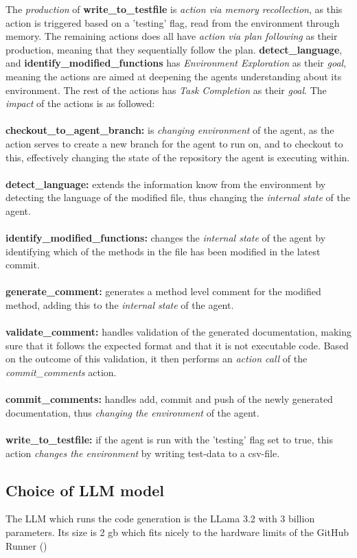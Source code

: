\noindent
The \textit{production} of \textbf{write\_to\_testfile} is \textit{action via memory recollection}, as 
this action is triggered based on a 'testing' flag, read from the environment through memory. The remaining actions does all have \textit{action via plan following} as their production, meaning that they sequentially follow the plan. \textbf{detect\_language}, and \textbf{identify\_modified\_functions} has \textit{Environment Exploration} as their \textit{goal}, meaning the actions are aimed at deepening the agents understanding about its environment. The rest of the actions has \textit{Task Completion} as their \textit{goal}. The \textit{impact} of the actions is as followed:
\\\\
\textbf{checkout\_to\_agent\_branch:} is \textit{changing environment} of the agent, as the action serves to create a new branch for the agent to run on, and to checkout to this, effectively changing the state of the repository the agent is executing within.
\\ \\
\textbf{detect\_language:} extends the information know from the environment by detecting the language of the modified file, thus changing the \textit{internal state} of the agent.
\\ \\
\textbf{identify\_modified\_functions:} changes the \textit{internal state} of the agent by identifying which of the methods in the file has been modified in the latest commit.
\\ \\
\textbf{generate\_comment:} generates a method level comment for the modified method, adding this to the \textit{internal state} of the agent.
\\ \\
\textbf{validate\_comment:} handles validation of the generated documentation, making sure that it follows the expected format and that it is not executable code. Based on the outcome of this validation, it then performs an \textit{action call} of the \textit{commit\_comments} action.
\\ \\
\textbf{commit\_comments:} handles add, commit and push of the newly generated documentation, thus \textit{changing the environment} of the agent.
\\ \\
\textbf{write\_to\_testfile:} if the agent is run with the 'testing' flag set to true, this action \textit{changes the environment} by writing test-data to a csv-file.

\subsection{Choice of LLM model}
The LLM which runs the code generation is the LLama 3.2 with 3 billion parameters. Its size is 2 gb which fits nicely to the hardware limits of the GitHub Runner ()
